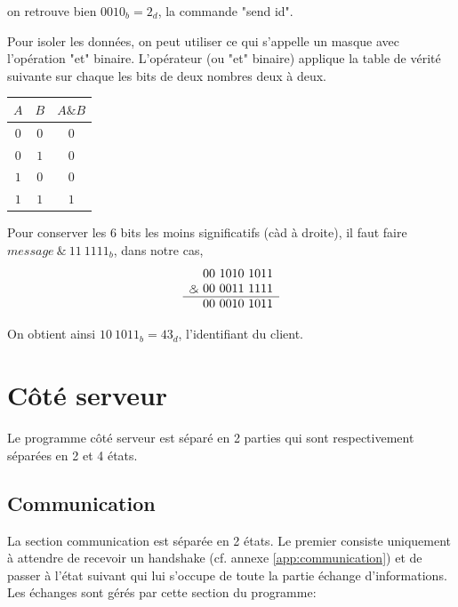 on retrouve bien $0010_b = 2_d$, la commande "send id".

Pour isoler les données, on peut utiliser ce qui s'appelle un masque avec l'opération "et" binaire. L'opérateur \binampersand (ou "et" binaire) applique la table de vérité suivante sur chaque les bits de deux nombres deux à deux.

\begin{center}
  \begin{tabular}{|c|c||c|}
    \hline
    $A$ & $B$ & $A \binampersand B$ \\
    \hline
    $0$ & $0$ & $0$ \\
    \hline
    $0$ & $1$ & $0$ \\
    \hline
    $1$ & $0$ & $0$ \\
    \hline
    $1$ & $1$ & $1$ \\
    \hline
  \end{tabular}
\end{center}

Pour conserver les 6 bits les moins significatifs (càd à droite), il faut faire $message\ \binampersand\ 11\ 1111_b$, dans notre cas, \[
\begin{array}[t]{r}
               00\ 1010\ 1011 \\
\binampersand\ 00\ 0011\ 1111 \\ \hline
               00\ 0010\ 1011
\end{array}
\]

On obtient ainsi $10\ 1011_b = 43_d$, l'identifiant du client.

\pagebreak

\section{Côté serveur}
Le programme côté serveur est séparé en 2 parties qui sont respectivement séparées en 2 et 4 états.
\subsection{Communication}
La section communication est séparée en 2 états. Le premier consiste uniquement à attendre de recevoir un handshake (cf. annexe \ref{app:communication}) et de passer à l'état suivant qui lui s'occupe de toute la partie échange d'informations.\\
Les échanges sont gérés par cette section du programme:

